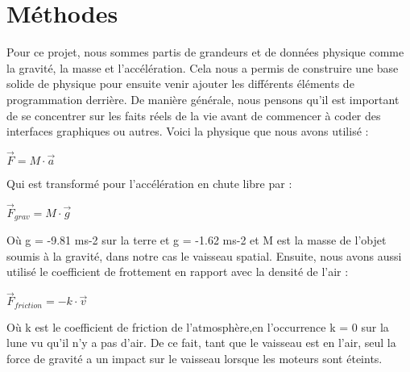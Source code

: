 \section{Méthodes}

Pour ce projet, nous sommes partis de grandeurs et de données physique comme la gravité, la masse et l'accélération. Cela nous a permis de construire une base solide de physique pour ensuite venir ajouter les différents éléments de programmation derrière. De manière générale, nous pensons qu'il est important de se concentrer sur les faits réels de la vie avant de commencer à coder des interfaces graphiques ou autres.
Voici la physique que nous avons utilisé : \cite{SonNasa}
\begin{center}
$\overrightarrow{F}= M \cdot \overrightarrow{a}$\\
\end{center}
Qui est transformé pour l’accélération en chute libre par :
\begin{center}
$\overrightarrow{F}_{grav} = M \cdot \overrightarrow{g}$\\
\end{center}
Où g = -9.81 ms-2 sur la terre et g = -1.62 ms-2 et M est la masse de l’objet soumis à la gravité, dans notre cas le vaisseau spatial.
Ensuite, nous avons aussi utilisé le coefficient de frottement en rapport avec la densité de l’air :
\begin{center}
$\overrightarrow{F}_{friction} = -k \cdot \overrightarrow{v}$\\
\end{center}
Où k est le coefficient de friction de l'atmosphère,en l'occurrence k = 0 sur la lune vu qu'il n'y a pas d'air. De ce fait, tant que le vaisseau est en l'air, seul la force de gravité a un impact sur le vaisseau lorsque les moteurs sont éteints.\\
